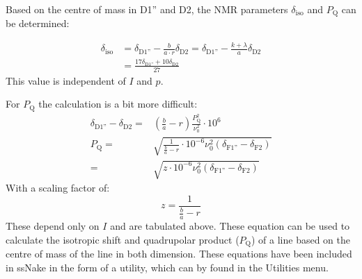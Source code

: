 \documentclass[11pt,a4paper]{article}
\begin{document}
Based on the centre of mass in D1'' and D2, the NMR parameters $\delta_\text{iso}$ and $P_\text{Q}$ can be determined:

\begin{align}
  \delta_\text{iso} & = \delta_\text{D1''} - \frac{b}{a\cdot r} \delta_\text{D2} =
                      \delta_\text{D1''} - \frac{k+\lambda}{a} \delta_\text{D2} \\
                    & = \frac{17 \delta_\text{D1''} + 10  \delta_\text{D2}}{27}
\end{align}
This value is independent of $I$ and $p$.

For $P_\text{Q}$ the calculation is a bit more difficult:
\begin{align}
  \delta_\text{D1''} - \delta_\text{D2} =& \left( \frac{b}{a} - r \right)
                                           \frac{P_\text{Q}^2}{\nu_0^2} \cdot 10^6\\ 
  P_\text{Q} =& \sqrt{  \frac{1}{\frac{b}{a}-r}\cdot 10^{-6} \nu_0^2 (\delta_\text{F1''} -
                \delta_\text{F2}) } \\
  =& \sqrt{  z \cdot 10^{-6} \nu_0^2 (\delta_\text{F1''} -
     \delta_\text{F2}) } 
\end{align}
With a scaling factor of:
\begin{equation}
  z = \frac{1}{\frac{b}{a}-r}
\end{equation}
These depend only on $I$ and are tabulated above.
These equation can be used to calculate the isotropic shift and quadrupolar product ($P_\text{Q}$) of a line based on the centre of mass of the line in both dimension.
These equations have been included in ssNake in the form of a utility, which can by found in the Utilities menu.
\end{document}

